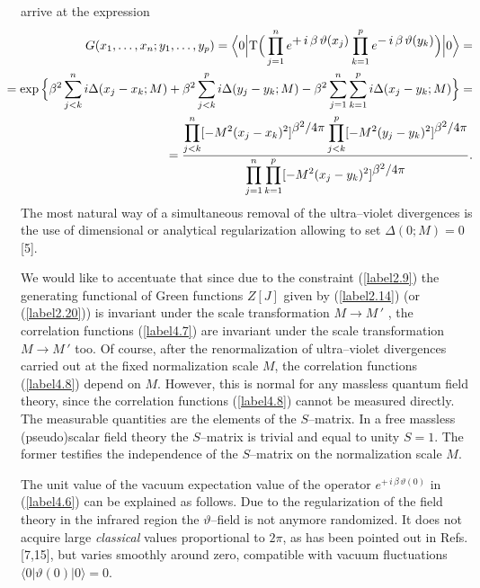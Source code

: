 \documentclass[a4paper,12pt] {article}
\begin{document}
arrive at the expression
%
\begin{eqnarray}\label{label4.8}
\hspace{-0.3in}&&G(x_1,\ldots,x_n;y_1,\ldots,y_p) = \Big\langle
0\Big|{\rm T}\Big(\prod^{n}_{j=1}e^{\textstyle
+\,i\,\beta\,\vartheta(x_j)} \prod^{p}_{k=1}e^{\textstyle
-\,i\,\beta\,\vartheta(y_k)}\Big)\Big|0\Big\rangle =\nonumber\\
\hspace{-0.3in}&&=\exp\Big\{\beta^2\sum^{n}_{j < k}i\Delta(x_j - x_k;
M) + \beta^2\sum^{p}_{j < k}i\Delta(y_j - y_k; M) - \beta^2\sum^{n}_{j
= 1}\sum^{p}_{k = 1}i\Delta(x_j - y_k; M)\Big\}=\nonumber\\
\hspace{-0.3in}&&= \frac{\displaystyle \prod^{n}_{j < k}
[-M^2(x_j-x_k)^2]^{\textstyle \beta^2/4\pi}\prod^{p}_{j < k}
[-M^2(y_j-y_k)^2]^{\textstyle \beta^2/4\pi}}{\displaystyle
\prod^{n}_{j = 1} \prod^{p}_{k = 1}[-M^2(x_j-y_k)^2]^{\textstyle
\beta^2/4\pi}}.
\end{eqnarray}
%
The most natural way of a simultaneous removal of the ultra--violet
divergences is the use of dimensional or analytical regularization
allowing to set $\Delta(0; M) = 0$ [5]. 

We would like to accentuate that since due to the constraint
(\ref{label2.9}) the generating functional of Green functions $Z[J]$
given by (\ref{label2.14}) (or (\ref{label2.20})) is invariant under
the scale transformation $M \to M\,'$ , the correlation functions
(\ref{label4.7}) are invariant under the scale transformation $M \to
M\,'$ too. Of course, after the renormalization of ultra--violet
divergences carried out at the fixed normalization scale $M$, the
correlation functions (\ref{label4.8}) depend on $M$. However, this is
normal for any massless quantum field theory, since the correlation
functions (\ref{label4.8}) cannot be measured directly. The measurable
quantities are the elements of the $S$--matrix. In a free massless
(pseudo)scalar field theory the $S$--matrix is trivial and equal to
unity $S = 1$. The former testifies the independence of the
$S$--matrix on the normalization scale $M$.

The unit value of the vacuum expectation value of the operator
$e^{\textstyle +\,i\,\beta\,\vartheta(0)}$ in (\ref{label4.6}) can be
explained as follows. Due to the regularization of the field theory in
the infrared region the $\vartheta$--field is not anymore randomized.
It does not acquire large {\it classical} values proportional to
$2\pi$, as has been pointed out in Refs.[7,15], but varies smoothly
around zero, compatible with vacuum fluctuations $\langle
0|\vartheta(0)|0\rangle = 0$.
\end{document}

